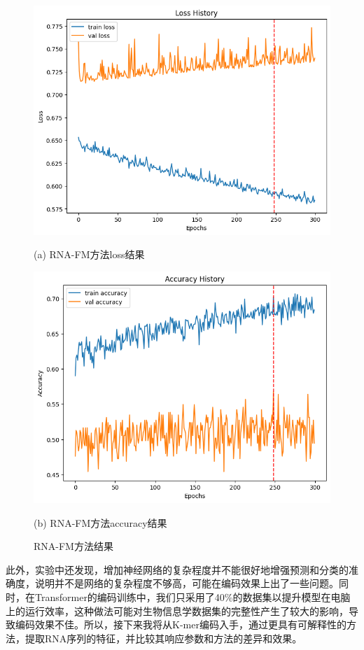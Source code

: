 \documentclass[a4paper,11pt,AutoFakeBold]{ctexart}
\begin{document}
\begin{figure}[h]
    \centering
    \begin{minipage}{0.49\linewidth}
        \centering
        \includegraphics[height=0.67\linewidth]{Figures/RNAFM_loss.png}
        \caption*{(a) RNA-FM方法loss结果}
    \end{minipage}
    \begin{minipage}{0.49\linewidth}
        \centering
        \includegraphics[height=0.67\linewidth]{Figures/RNAFM_acc.png}
        \caption*{(b) RNA-FM方法accuracy结果}
    \end{minipage}
    \caption{RNA-FM方法结果}
    \label{fig:RNAFM_results}
\end{figure}

此外，实验中还发现，增加神经网络的复杂程度并不能很好地增强预测和分类的准确度，说明并不是网络的复杂程度不够高，可能在编码效果上出了一些问题。同时，在Transformer的编码训练中，我们只采用了40\%的数据集以提升模型在电脑上的运行效率，这种做法可能对生物信息学数据集的完整性产生了较大的影响，导致编码效果不佳。所以，接下来我将从K-mer编码入手，通过更具有可解释性的方法，提取RNA序列的特征，并比较其响应参数和方法的差异和效果。
\end{document}
